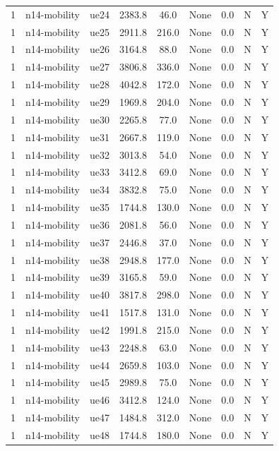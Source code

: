 \begin{table}[ht]
\begin{tabular}{|c|c|c|c|c|c|c|c|c|}
1 & n14-mobility & ue24 & 2383.8 & 46.0 & None & 0.0 & N & Y \\
1 & n14-mobility & ue25 & 2911.8 & 216.0 & None & 0.0 & N & Y \\
1 & n14-mobility & ue26 & 3164.8 & 88.0 & None & 0.0 & N & Y \\
1 & n14-mobility & ue27 & 3806.8 & 336.0 & None & 0.0 & N & Y \\
1 & n14-mobility & ue28 & 4042.8 & 172.0 & None & 0.0 & N & Y \\
1 & n14-mobility & ue29 & 1969.8 & 204.0 & None & 0.0 & N & Y \\
1 & n14-mobility & ue30 & 2265.8 & 77.0 & None & 0.0 & N & Y \\
1 & n14-mobility & ue31 & 2667.8 & 119.0 & None & 0.0 & N & Y \\
1 & n14-mobility & ue32 & 3013.8 & 54.0 & None & 0.0 & N & Y \\
1 & n14-mobility & ue33 & 3412.8 & 69.0 & None & 0.0 & N & Y \\
1 & n14-mobility & ue34 & 3832.8 & 75.0 & None & 0.0 & N & Y \\
1 & n14-mobility & ue35 & 1744.8 & 130.0 & None & 0.0 & N & Y \\
1 & n14-mobility & ue36 & 2081.8 & 56.0 & None & 0.0 & N & Y \\
1 & n14-mobility & ue37 & 2446.8 & 37.0 & None & 0.0 & N & Y \\
1 & n14-mobility & ue38 & 2948.8 & 177.0 & None & 0.0 & N & Y \\
1 & n14-mobility & ue39 & 3165.8 & 59.0 & None & 0.0 & N & Y \\
1 & n14-mobility & ue40 & 3817.8 & 298.0 & None & 0.0 & N & Y \\
1 & n14-mobility & ue41 & 1517.8 & 131.0 & None & 0.0 & N & Y \\
1 & n14-mobility & ue42 & 1991.8 & 215.0 & None & 0.0 & N & Y \\
1 & n14-mobility & ue43 & 2248.8 & 63.0 & None & 0.0 & N & Y \\
1 & n14-mobility & ue44 & 2659.8 & 103.0 & None & 0.0 & N & Y \\
1 & n14-mobility & ue45 & 2989.8 & 75.0 & None & 0.0 & N & Y \\
1 & n14-mobility & ue46 & 3412.8 & 124.0 & None & 0.0 & N & Y \\
1 & n14-mobility & ue47 & 1484.8 & 312.0 & None & 0.0 & N & Y \\
1 & n14-mobility & ue48 & 1744.8 & 180.0 & None & 0.0 & N & Y \\

\end{tabular}
\end{table}
